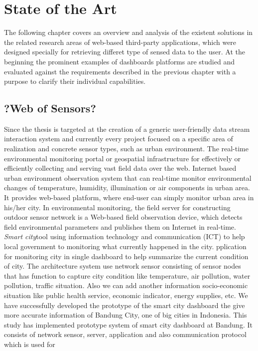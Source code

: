 \chapter{State of the Art}
The following chapter covers an overview and analysis of the existent solutions in
the related research areas of web-based third-party applications, which were designed specially for retrieving differet type of sensed data to the user. At the beginning the prominent examples of dashboards platforms are studied and evaluated against the requirements described in the previous chapter with a purpose to clarify their individual capabilities.

\section{?Web of Sensors?}
 Since the thesis is targeted at the creation of a generic user-friendly data stream interaction system and currently every project focused on a specific area of realization and concrete sensor types, such as urban environment\cite{song2010real}. The real-time environmental monitoring portal or geospatial infrastructure for effectively or  efficiently collecting and serving vast field data over the web. Internet based urban environment observation system that can real-time monitor environmental changes of temperature, humidity, illumination or air components in urban area. It provides web-based platform, where end-user can simply monitor urban area in his/her city. In environmental monitoring, the field server for constructing outdoor sensor network is a Web-based field observation device, which detects field environmental parameters and publishes them on Internet in real-time.
\newline
\emph{Smart city}\cite{6588063}tool using information technology and communication (ICT) to help local government to monitoring what currently happened in the city. pplication for monitoring city in single dashboard to help summarize the current condition of city. The architecture system use network sensor consisting of sensor nodes that has
function to capture city condition like temperature, air pollution,
water pollution, traffic situation. Also we can add another information socio-economic situation like public health service, economic indicator, energy supplies, etc. We have successfully developed the prototype of the smart city dashboard the give more accurate information of Bandung City, one of big cities in Indonesia. This study has implemented prototype system of smart city dashboard at Bandung. It consists of network sensor, server, application and also communication protocol which is used for
